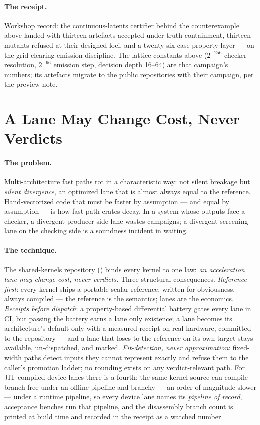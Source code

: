\paragraph{The receipt.} Workshop record: the continuous-latents
certifier behind the counterexample above landed with thirteen
artefacts accepted under truth containment, thirteen mutants refused
at their designed loci, and a twenty-six-case property layer --- on
the grid-clearing emission discipline. The lattice constants above
($2^{-256}$ checker resolution, $2^{-96}$ emission step, decision
depth 16--64) are that campaign's numbers; its artefacts migrate to
the public repositories with their campaign, per the preview note.

\section{A Lane May Change Cost, Never Verdicts}
\label{sec:pearl-lane-law}

\paragraph{The problem.} Multi-architecture fast paths rot in a
characteristic way: not silent breakage but \emph{silent divergence},
an optimized lane that is almost always equal to the reference.
Hand-vectorized code that must be faster by assumption --- and equal
by assumption --- is how fast-path crates decay. In a system whose
outputs face a checker, a divergent producer-side lane wastes
campaigns; a divergent screening lane on the checking side is a
soundness incident in waiting.

\paragraph{The technique.} The shared-kernels repository
() binds every kernel to one law:
\emph{an acceleration lane may change cost, never verdicts.} Three
structural consequences. \emph{Reference first}: every kernel ships a
portable scalar reference, written for obviousness, always compiled
--- the reference is the semantics; lanes are the economics.
\emph{Receipts before dispatch}: a property-based differential battery
gates every lane in CI, but passing the battery earns a lane only
existence; a lane becomes its architecture's default only with a
measured receipt on real hardware, committed to the repository --- and
a lane that loses to the reference on its own target stays available,
un-dispatched, and marked. \emph{Fit-detection, never approximation}:
fixed-width paths detect inputs they cannot represent exactly and
refuse them to the caller's promotion ladder; no rounding exists on
any verdict-relevant path. For JIT-compiled device lanes there is a
fourth: the same kernel source can compile branch-free under an
offline pipeline and branchy --- an order of magnitude slower ---
under a runtime pipeline, so every device lane names its \emph{pipeline
of record}, acceptance benches run that pipeline, and the disassembly
branch count is printed at build time and recorded in the receipt as a
watched number.

